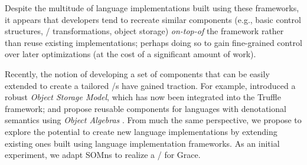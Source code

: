 Despite the multitude of language implementations built using these frameworks, it appears that developers tend to recreate similar components (e.g., basic control structures, \AST/ transformations, object storage) \emph{on-top-of} the framework rather than reuse existing implementations; perhaps doing so to gain fine-grained control over later optimizations (at the cost of a significant amount of work).

Recently, the notion of developing a set of components that can be easily extended to create a tailored \VM/s have gained traction. For example,  introduced a robust \emph{Object Storage Model}, which has now been integrated into the Truffle framework; and \citet{Inostroza2015} propose reusable components for languages with denotational semantics using \emph{Object Algebras} . From much the same perspective, we propose to explore the potential to create new language implementations by extending existing ones built using language implementation frameworks.
As an initial experiment, we adapt SOMns to realize a \VM/ for Grace.


%




%





